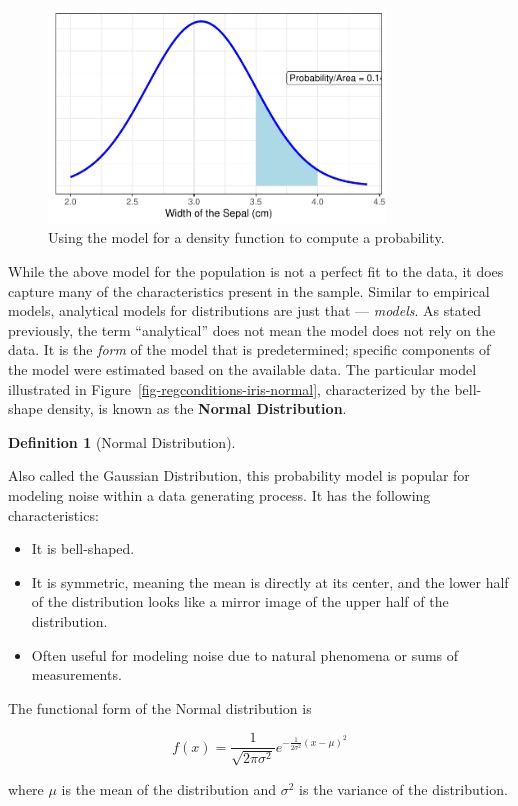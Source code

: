 \documentclass[
  letterpaper,
  DIV=11,
  numbers=noendperiod]{scrreprt}
\providecommand{\tightlist}{%
  \setlength{\itemsep}{0pt}\setlength{\parskip}{0pt}}\usepackage{longtable,booktabs,array}
\theoremstyle{plain}
\theoremstyle{definition}
\theoremstyle{definition}
\newtheorem{definition}{Definition}[chapter]
\theoremstyle{remark}
\begin{document}
\begin{figure}

{\centering \includegraphics[width=0.8\textwidth,height=\textheight]{./images/fig-regconditions-iris-prob-1.pdf}

}

\caption{\label{fig-regconditions-iris-prob}Using the model for a
density function to compute a probability.}

\end{figure}

While the above model for the population is not a perfect fit to the
data, it does capture many of the characteristics present in the sample.
Similar to empirical models, analytical models for distributions are
just that --- \emph{models}. As stated previously, the term
``analytical'' does not mean the model does not rely on the data. It is
the \emph{form} of the model that is predetermined; specific components
of the model were estimated based on the available data. The particular
model illustrated in Figure~\ref{fig-regconditions-iris-normal},
characterized by the bell-shape density, is known as the \textbf{Normal
Distribution}.

\begin{definition}[Normal
Distribution]\protect\hypertarget{def-normal-distribution}{}\label{def-normal-distribution}

Also called the Gaussian Distribution, this probability model is popular
for modeling noise within a data generating process. It has the
following characteristics:

\begin{itemize}
\tightlist
\item
  It is bell-shaped.
\item
  It is symmetric, meaning the mean is directly at its center, and the
  lower half of the distribution looks like a mirror image of the upper
  half of the distribution.
\item
  Often useful for modeling noise due to natural phenomena or sums of
  measurements.
\end{itemize}

The functional form of the Normal distribution is

\[f(x) = \frac{1}{\sqrt{2\pi\sigma^2}} e^{-\frac{1}{2\sigma^2}(x - \mu)^2}\]

where \(\mu\) is the mean of the distribution and \(\sigma^2\) is the
variance of the distribution.

\end{definition}
\end{document}
